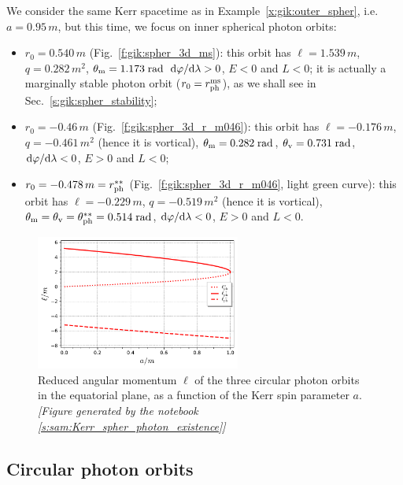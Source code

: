 \begin{example}
We consider the same Kerr spacetime as in Example~\ref{x:gik:outer_spher},
i.e. $a=0.95\, m$, but this time, we focus on inner spherical photon orbits:
\begin{itemize}
\item $r_0 = 0.540\, m$ (Fig.~\ref{f:gik:spher_3d_ms}):
this orbit has $\ell = 1.539\, m$, $q=0.282\, m^2$, $\theta_{\rm m} = 1.173\;{\rm rad}$
$\mathrm{d}\varphi/\mathrm{d}\lambda > 0$, $E<0$ and $L<0$; it is actually a marginally stable
photon orbit ($r_0 = r_{\rm ph}^{\rm ms}$), as we shall see
in Sec.~\ref{s:gik:spher_stability};
\item $r_0 = -0.46\, m$ (Fig.~\ref{f:gik:spher_3d_r_m046}):
this orbit has $\ell = -0.176\, m$, $q=-0.461\, m^2$ (hence it is vortical),
$\theta_{\rm m} = 0.282\;{\rm rad}$, $\theta_{\rm v} = 0.731\;{\rm rad}$,
$\mathrm{d}\varphi/\mathrm{d}\lambda < 0$, $E>0$ and $L<0$;
\item $r_0 = -0.478\, m = r_{\rm ph}^{**}$ (Fig.~\ref{f:gik:spher_3d_r_m046},
light green curve): this orbit has $\ell = -0.229\, m$, $q=-0.519\, m^2$ (hence it is vortical),
$\theta_{\rm m} = \theta_{\rm v} = \theta_{\rm ph}^{**} = 0.514\;{\rm rad}$,
$\mathrm{d}\varphi/\mathrm{d}\lambda < 0$, $E>0$ and $L<0$.
\end{itemize}
\end{example}


\begin{figure}
\centerline{\includegraphics[width=0.6\textwidth]{gik_ell_circ_equat.pdf}}
\caption[]{\label{f:gik:ell_circ_equat} \footnotesize
Reduced angular momentum $\ell$ of the three circular photon orbits in the
equatorial plane, as a function of the Kerr spin parameter $a$.
\textsl{[Figure generated by the notebook \ref{s:sam:Kerr_spher_photon_existence}]}
}
\end{figure}

\subsection{Circular photon orbits} \label{s:gik:circular_orbits}

